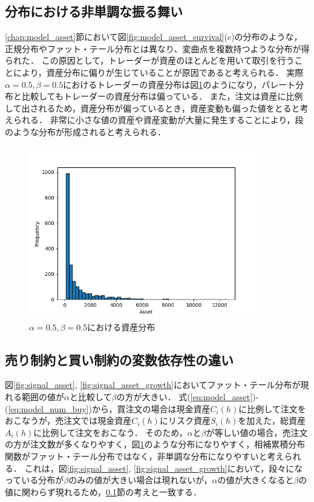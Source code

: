 \documentclass[titlepage]{jsreport}
\begin{document}
\subsection{分布における非単調な振る舞い}\label{chap:step}
\ref{chap:model_asset}節において図\ref{fig:model_asset_survival}(c)の分布のような，正規分布やファット・テール分布とは異なり、変曲点を複数持つような分布が得られた．
この原因として，トレーダーが資産のほとんどを用いて取引を行うことにより，資産分布に偏りが生じていることが原因であると考えられる．
実際$\alpha = 0.5, \beta = 0.5$におけるトレーダーの資産分布は図\ref{fig:hist_asset}のようになり，パレート分布と比較してもトレーダーの資産分布は偏っている．
また，注文は資産に比例して出されるため，資産分布が偏っているとき，資産変動も偏った値をとると考えられる．
非常に小さな値の資産や資産変動が大量に発生することにより，段のような分布が形成されると考えられる．

\begin{figure}
    \centering
    \includegraphics[width=10cm]{fig/hist.png}
    \caption{$\alpha = 0.5, \beta = 0.5$における資産分布}
    \label{fig:hist_asset}
\end{figure}


\subsection{売り制約と買い制約の変数依存性の違い}
図\ref{fig:signal_asset}, \ref{fig:signal_asset_growth}においてファット・テール分布が現れる範囲の値が$\alpha$と比較して$\beta$の方が大きい．
式(\ref{eq:model_asset})-(\ref{eq:model_num_buy})から，買注文の場合は現金資産$C_i(h)$に比例して注文をおこなうが，売注文では現金資産$C_i(h)$にリスク資産$S_i(h)$を加えた，総資産$A_i(h)$に比例して注文をおこなう．
そのため，$\alpha$と$\beta$が等しい値の場合，売注文の方が注文数が多くなりやすく，図\ref{fig:hist_asset}のような分布になりやすく，相補累積分布関数がファット・テール分布ではなく，非単調な分布になりやすいと考えられる．
これは，図\ref{fig:signal_asset}, \ref{fig:signal_asset_growth}において，段々になっている分布が$\beta$のみの値が大きい場合は現れないが，$\alpha$の値が大きくなると$\beta$の値に関わらず現れるため，\ref{chap:step}節の考えと一致する．
\end{document}
